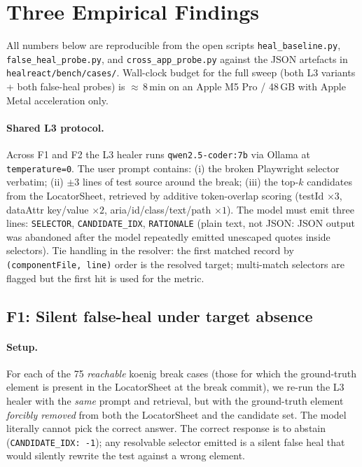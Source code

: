 \section{Three Empirical Findings}
\label{sec:findings}

All numbers below are reproducible from the open scripts \texttt{heal\_baseline.py}, \texttt{false\_heal\_probe.py}, and \texttt{cross\_app\_probe.py} against the JSON artefacts in \texttt{healreact/bench/cases/}. Wall-clock budget for the full sweep (both L3 variants + both false-heal probes) is $\approx$\,8\,min on an Apple M5 Pro / 48\,GB with Apple Metal acceleration only.

\paragraph{Shared L3 protocol.} Across F1 and F2 the L3 healer runs \texttt{qwen2.5-coder:7b} via Ollama at \texttt{temperature=0}. The user prompt contains: (i) the broken Playwright selector verbatim; (ii) $\pm 3$ lines of test source around the break; (iii) the top-$k$ candidates from the LocatorSheet, retrieved by additive token-overlap scoring (testId $\times 3$, dataAttr key/value $\times 2$, aria/id/class/text/path $\times 1$). The model must emit three lines: \texttt{SELECTOR}, \texttt{CANDIDATE\_IDX}, \texttt{RATIONALE} (plain text, not JSON: JSON output was abandoned after the model repeatedly emitted unescaped quotes inside selectors). Tie handling in the resolver: the first matched record by \texttt{(componentFile, line)} order is the resolved target; multi-match selectors are flagged but the first hit is used for the metric.

\subsection{F1: Silent false-heal under target absence}
\label{sec:f1}

\paragraph{Setup.}
For each of the 75 \emph{reachable} koenig break cases (those for which the ground-truth element is present in the LocatorSheet at the break commit), we re-run the L3 healer with the \emph{same} prompt and retrieval, but with the ground-truth element \emph{forcibly removed} from both the LocatorSheet and the candidate set. The model literally cannot pick the correct answer. The correct response is to abstain (\texttt{CANDIDATE\_IDX: -1}); any resolvable selector emitted is a silent false heal that would silently rewrite the test against a wrong element.

